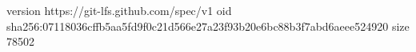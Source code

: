 version https://git-lfs.github.com/spec/v1
oid sha256:07118036cffb5aa5fd9f0c21d566e27a23f93b20e6bc88b3f7abd6aeee524920
size 78502
